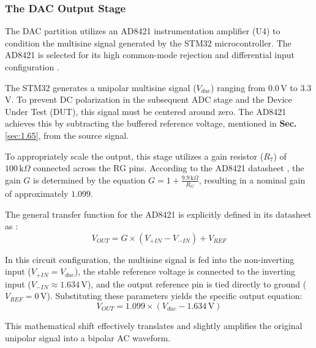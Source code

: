 \subsubsection{The DAC Output Stage}

The DAC partition utilizes an AD8421 instrumentation amplifier (U4) to condition the multisine signal generated by the STM32 microcontroller. The AD8421 is selected for its high common-mode rejection and differential input configuration \cite{ad8421_datasheet}. 

The STM32 generates a unipolar multisine signal ($V_{dac}$) ranging from 0.0\,V to 3.3\,V. To prevent DC polarization in the subsequent ADC stage and the Device Under Test (DUT), this signal must be centered around zero. The AD8421 achieves this by subtracting the buffered reference voltage, mentioned in \textbf{Sec.}\ref{sec:1.65}, from the source signal. 

To appropriately scale the output, this stage utilizes a gain resistor ($R_7$) of $100\,\mathrm{k}\Omega$ connected across the RG pins. According to the AD8421 datasheet \cite{ad8421_datasheet}, the gain $G$ is determined by the equation $G = 1 + \frac{9.9\,\mathrm{k}\Omega}{R_G}$, resulting in a nominal gain of approximately $1.099$.

The general transfer function for the AD8421 is explicitly defined in its datasheet as \cite{ad8421_datasheet}:
\begin{equation}
    V_{OUT} = G \times (V_{+IN} - V_{-IN}) + V_{REF}
\end{equation}

In this circuit configuration, the multisine signal is fed into the non-inverting input ($V_{+IN} = V_{dac}$), the stable reference voltage is connected to the inverting input ($V_{-IN} \approx 1.634\,\mathrm{V}$), and the output reference pin is tied directly to ground ($V_{REF} = 0\,\mathrm{V}$). Substituting these parameters yields the specific output equation:
\begin{equation}
    V_{OUT} = 1.099 \times (V_{dac} - 1.634\,\mathrm{V})
\end{equation}

This mathematical shift effectively translates and slightly amplifies the original unipolar signal into a bipolar AC waveform. 


